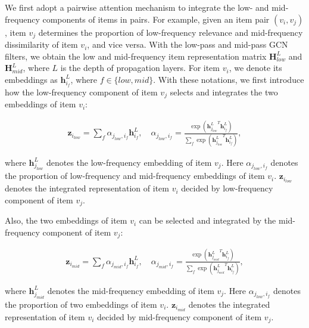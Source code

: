 \documentclass[letterpaper]{article} %
\newcommand{\suhang}[1]{\textcolor{blue}{SW: #1}}
\begin{document}
We first adopt a pairwise attention mechanism to integrate the low- and mid-frequency components of items in pairs. For example, given an item pair $(v_i, v_j)$, item $v_j$ determines the proportion of low-frequency relevance and mid-frequency dissimilarity of item $v_i$, and vice versa. 
With the low-pass and mid-pass GCN filters, we obtain the low and mid-frequency item representation matrix $\mathbf{H}_{low}^L$ and  $\mathbf{H}_{mid}^L$, where $L$ is the depth of propagation layers. For item $v_i$, we denote its embeddings as $\mathbf{h}_{i_f}^L$, where $f \in \{low,mid\}$. With these notations, we first introduce how the low-frequency component of item $v_j$ selects and integrates the two embeddings of item $v_i$: 
\begin{small}
\begin{gather}
   \mathbf{z}_{i_{low}}=\sum_{f}\alpha_{j_{low},i_{f}}\mathbf{{h}}_{i_f}^{L}, \quad
   \alpha_{j_{low},i_f}=\frac{\exp({\mathbf{h}_{j_{low}}^{L}}^T\mathbf{h}_{i_f}^{L})}{\sum_f\exp({\mathbf{h}_{j_{low}}^{L}}^T\mathbf{h}_{i_f}^{L})},
   \label{eq:pair_low}
\end{gather}
\end{small}
where $\mathbf{h}_{j_{low}}^L$ denotes the low-frequency embedding of item $v_j$. Here $\alpha_{j_{low},i_f}$ denotes the proportion of low-frequency and mid-frequency embeddings of item $v_i$. $\mathbf{z}_{i_{low}}$ denotes the integrated representation of item $v_i$ decided by low-frequency component of item $v_j$.


Also, the two embeddings of item $v_i$ can be selected and integrated by the mid-frequency component of item $v_j$:
\begin{small}
\begin{gather}
   \mathbf{z}_{i_{mid}}=\sum_{f}\alpha_{j_{mid},i_{f}}\mathbf{{h}}_{i_f}^{L}, \quad
   \alpha_{j_{mid},i_f}=\frac{\exp({\mathbf{h}_{j_{mid}}^{L}}^T\mathbf{h}_{i_f}^{L})}{\sum_f\exp({\mathbf{h}_{j_{mid}}^{L}}^T\mathbf{h}_{i_f}^{L})},
   \label{eq:pair_mid}
\end{gather}
\end{small}
where $\mathbf{h}_{j_{mid}}^L$ denotes the mid-frequency embedding of item $v_j$. Here $\alpha_{j_{low},i_f}$ denotes the proportion of two embeddings of item $v_i$. $\mathbf{z}_{i_{mid}}$ denotes the integrated representation of item $v_i$ decided by mid-frequency component of item $v_j$.
\end{document}
